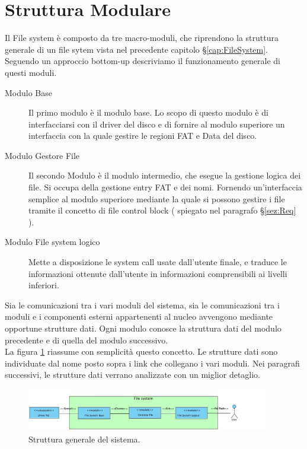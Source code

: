 \section{Struttura Modulare}
\label{sech:Struttura_Modulare}
Il File system è composto da tre macro-moduli, che riprendono la struttura
generale di un file sytem vista nel precedente capitolo §\ref{cap:FileSystem}. Seguendo un
approccio bottom-up descriviamo il funzionamento generale di questi moduli.
\begin{description}
 \item[Modulo Base]
    Il primo modulo è il modulo base. Lo scopo di questo modulo è di
interfacciarsi con il driver del disco e di fornire al modulo superiore un
interfaccia con la quale gestire le regioni FAT e Data del disco. 
 \end{description}
\begin{description}
 \item[Modulo Gestore File]
  Il secondo Modulo è il modulo intermedio, che esegue la gestione logica dei file.
  Si occupa della gestione entry FAT e dei nomi. Fornendo un'interfaccia
  semplice al modulo superiore mediante la quale si possono gestire i file tramite il concetto di file control block ( spiegato nel paragrafo §\ref{sez:Req} ).
 \end{description}
\begin{description}
 \item[Modulo File system logico]
 Mette a disposizione le system call usate dall'utente finale, e traduce le informazioni ottenute dall'utente in informazioni comprensibili ai livelli inferiori. 
 \end{description}
Sia le comunicazioni tra i vari moduli del sistema, sia le comunicazioni tra i moduli e i componenti esterni appartenenti al nucleo avvengono mediante opportune strutture dati.  
Ogni modulo conosce la struttura dati del modulo precedente e di quella del modulo successivo. \\
La figura \ref{Fig:StrutturaFS} riassume con semplicità questo concetto. 
Le strutture dati sono individuate dal nome posto sopra i link che collegano i vari moduli. Nei paragrafi successivi, le strutture dati verrano analizzate con un miglior detaglio.\\

\begin{center}
\begin{figure}[h]
 \centering
 \includegraphics[width=400px,height=70px]{./Immagini/FS.jpg}
 \caption{Struttura generale del sistema.}
 \label{Fig:StrutturaFS}
\end{figure}\end{center}

